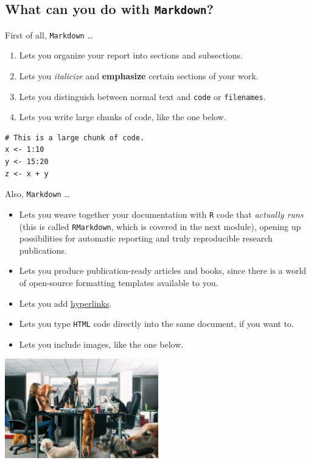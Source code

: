 \documentclass[
]{book}
\providecommand{\tightlist}{%
  \setlength{\itemsep}{0pt}\setlength{\parskip}{0pt}}
\begin{document}
\hypertarget{what-can-you-do-with-markdown}{%
\subsection*{\texorpdfstring{What can you do with \texttt{Markdown}?}{What can you do with Markdown?}}\label{what-can-you-do-with-markdown}}

First of all, \texttt{Markdown} \ldots{}

\begin{enumerate}
\def\labelenumi{\arabic{enumi}.}
\tightlist
\item
  Lets you organize your report into sections and subsections.\\
\item
  Lets you \emph{italicize} and \textbf{emphasize} certain sections of your work.
\item
  Lets you distinguish between normal text and \texttt{code} or \texttt{filenames}.
\item
  Lets you write large chunks of code, like the one below.
\end{enumerate}

\begin{verbatim}
# This is a large chunk of code. 
x <- 1:10
y <- 15:20
z <- x + y
\end{verbatim}

Also, \texttt{Markdown} \ldots{}

\begin{itemize}
\item
  Lets you weave together your documentation with \texttt{R} code that
  \emph{actually runs} (this is called \texttt{RMarkdown}, which is covered
  in the next module), opening up possibilities for automatic reporting
  and truly reproducible research publications.
\item
  Lets you produce publication-ready articles and books, since there is a
  world of open-source formatting templates available to you.
\item
  Lets you add \href{https://www.markdownguide.org/getting-started/}{hyperlinks}.
\item
  Lets you type \texttt{HTML} code directly into the same document,
  if you want to.
\item
  Lets you include images, like the one below.
\end{itemize}

\includegraphics[width=0.5\textwidth,height=\textheight]{img/markdown-dogs.jpeg}
\end{document}
